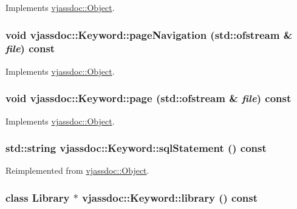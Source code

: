 Implements \hyperlink{classvjassdoc_1_1Object_bd43e77dbe80055f5adda67661dfaca4}{vjassdoc::Object}.\hypertarget{classvjassdoc_1_1Keyword_c8950d4ece99a58cc664daf5f652f37c}{
\subsubsection{\setlength{\rightskip}{0pt plus 5cm}void vjassdoc::Keyword::pageNavigation (std::ofstream \& {\em file}) const}}
\label{classvjassdoc_1_1Keyword_c8950d4ece99a58cc664daf5f652f37c}




Implements \hyperlink{classvjassdoc_1_1Object_736bbb6719edd8070d8f56c364a2764c}{vjassdoc::Object}.\hypertarget{classvjassdoc_1_1Keyword_207c989cefeeb0857adb76aa5d7bd842}{
\subsubsection{\setlength{\rightskip}{0pt plus 5cm}void vjassdoc::Keyword::page (std::ofstream \& {\em file}) const}}
\label{classvjassdoc_1_1Keyword_207c989cefeeb0857adb76aa5d7bd842}




Implements \hyperlink{classvjassdoc_1_1Object_a0489e38956f3507566b1bc6e3e2c8af}{vjassdoc::Object}.\hypertarget{classvjassdoc_1_1Keyword_b2d197337624e89955564ac684bfd5ad}{
\subsubsection{\setlength{\rightskip}{0pt plus 5cm}std::string vjassdoc::Keyword::sqlStatement () const}}
\label{classvjassdoc_1_1Keyword_b2d197337624e89955564ac684bfd5ad}




Reimplemented from \hyperlink{classvjassdoc_1_1Object_4e8ebbb0ce5b0bf91ec847b1e4a9f8fc}{vjassdoc::Object}.\hypertarget{classvjassdoc_1_1Keyword_9496b5c2a1eedee46d27dd166608b12f}{
\subsubsection{\setlength{\rightskip}{0pt plus 5cm}class {\bf Library} $\ast$ vjassdoc::Keyword::library () const}}
\label{classvjassdoc_1_1Keyword_9496b5c2a1eedee46d27dd166608b12f}




